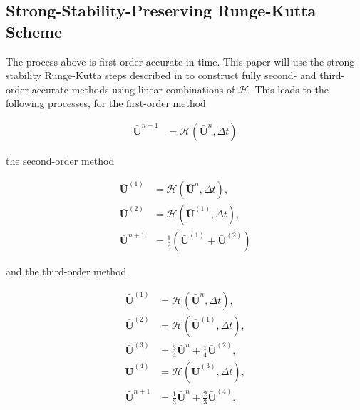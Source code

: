 \documentclass[SingleSpace,12pt,Proceedings]{Serre_ASCE}
\begin{document}
\subsection{Strong-Stability-Preserving Runge-Kutta Scheme} %
The process above is first-order accurate in time. This paper will use the strong stability Runge-Kutta steps described in  to construct fully second- and third-order accurate methods using linear combinations of $\mathcal{H}$. This leads to the following processes, for the first-order method
\begin{linenomath*}
\begin{align*}
\boldsymbol{\bar{U}}^{n+1} &= \mathcal{H}\left(\boldsymbol{\bar{U}}^{n},\Delta t\right)
\end{align*}
\end{linenomath*}
the second-order method
\begin{linenomath*}
\begin{align*}
\boldsymbol{\bar{U}}^{\left(1\right)} &= \mathcal{H}\left(\boldsymbol{\bar{U}}^{n},\Delta t\right), \\
\boldsymbol{\bar{U}}^{\left(2\right)} &= \mathcal{H}\left(\boldsymbol{\bar{U}}^{\left(1\right)},\Delta t\right), \\
\boldsymbol{\bar{U}}^{n+1} &=\frac{1}{2}\left(\boldsymbol{\bar{U}}^{\left(1\right)} + \boldsymbol{\bar{U}}^{\left(2\right)}  \right)
\end{align*}
\end{linenomath*}
and the third-order method
\begin{linenomath*}
\begin{align*}
\boldsymbol{\bar{U}}^{\left(1\right)} &= \mathcal{H}\left(\boldsymbol{\bar{U}}^{n},\Delta t\right), \\
\boldsymbol{\bar{U}}^{\left(2\right)} &= \mathcal{H}\left(\boldsymbol{\bar{U}}^{\left(1\right)},\Delta t\right), \\
\boldsymbol{\bar{U}}^{\left(3\right)} &= \frac{3}{4}\boldsymbol{\bar{U}}^{n} + \frac{1}{4}\boldsymbol{\bar{U}}^{\left(2\right)} , \\
\boldsymbol{\bar{U}}^{\left(4\right)} &= \mathcal{H}\left(\boldsymbol{\bar{U}}^{\left(3\right)},\Delta t\right), \\
\boldsymbol{\bar{U}}^{n+1} &= \frac{1}{3}\boldsymbol{\bar{U}}^{n} + \frac{2}{3}\boldsymbol{\bar{U}}^{\left(4\right)}.
\end{align*}
\end{linenomath*}
\end{document}
